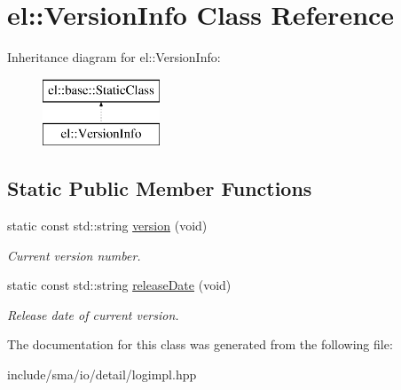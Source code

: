 \hypertarget{classel_1_1VersionInfo}{\section{el\-:\-:Version\-Info Class Reference}
\label{classel_1_1VersionInfo}
}
Inheritance diagram for el\-:\-:Version\-Info\-:\begin{figure}[H]
\begin{center}
\leavevmode
\includegraphics[height=2.000000cm]{classel_1_1VersionInfo}
\end{center}
\end{figure}
\subsection*{Static Public Member Functions}
\begin{DoxyCompactItemize}
\item 
\hypertarget{classel_1_1VersionInfo_a6fee512d52168445b2118ff2b31b4058}{static const std\-::string \hyperlink{classel_1_1VersionInfo_a6fee512d52168445b2118ff2b31b4058}{version} (void)}\label{classel_1_1VersionInfo_a6fee512d52168445b2118ff2b31b4058}

\begin{DoxyCompactList}\small\item\em Current version number. \end{DoxyCompactList}\item 
\hypertarget{classel_1_1VersionInfo_ab23c2545115898f4071fa4e125204946}{static const std\-::string \hyperlink{classel_1_1VersionInfo_ab23c2545115898f4071fa4e125204946}{release\-Date} (void)}\label{classel_1_1VersionInfo_ab23c2545115898f4071fa4e125204946}

\begin{DoxyCompactList}\small\item\em Release date of current version. \end{DoxyCompactList}\end{DoxyCompactItemize}


The documentation for this class was generated from the following file\-:\begin{DoxyCompactItemize}
\item 
include/sma/io/detail/logimpl.\-hpp\end{DoxyCompactItemize}
